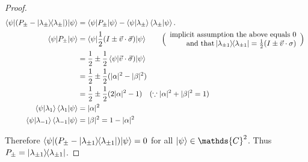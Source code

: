 \begin{proof}
		\begin{align*}
		\braket{\psi | (P_{\pm} - \kb{\lambda_\pm})| \psi}
		&= \braket{\psi | P_\pm | \psi} - \braket{\psi | \lambda_\pm} \braket{\lambda_\pm | \psi}.   \\
		\braket{\psi | P_\pm | \psi} &= \braket{\psi | \frac{1}{2}(I \pm \vec{v} \cdot \vec{\sigma}) | \psi}\tag*{$\Bigl(\Bigr. \begin{array}{r}\text{implicit assumption the above equals 0}\\ \text{and that} \kb{\lambda_{\pm1}}=\frac{1}{2}(I\pm\vec{v}\cdot{\sigma})\end{array} \Bigl.\Bigr)$ }\\
		&= \frac{1}{2} \pm \frac{1}{2} \braket{\psi | \vec{v} \cdot \vec{\sigma})| \psi}\\
		&= \frac{1}{2} \pm \frac{1}{2} (|\alpha|^2 - |\beta|^2)\\
		&= \frac{1}{2} \pm \frac{1}{2} (2|\alpha|^2 - 1) ~~~(\because |\alpha|^2 + |\beta|^2 = 1)\\
		\braket{\psi | \lambda_1} \braket{\lambda_1 | \psi} &= |\alpha|^2\\
		\braket{\psi | \lambda_{-1}} \braket{\lambda_{-1}| \psi} &= |\beta|^2 = 1  - |\alpha|^2
		\end{align*}

		Therefore $\braket{\psi | (P_\pm - \ket{\lambda_{\pm 1}}\hspace{-1mm} \bra{\lambda_{\pm 1}})| \psi} = 0$ for all $\ket{\psi} \in \mathds{C}^2$.
		Thus $P_\pm = \ket{\lambda_{\pm 1}}\hspace{-1mm} \bra{\lambda_{\pm 1}}$.
	\end{proof}

